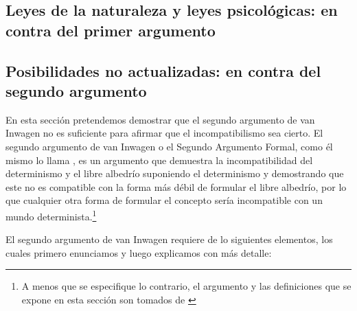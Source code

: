 \documentclass[12pt]{article} %
\begin{document}
	\subsection{Leyes de la naturaleza y leyes psicológicas: en contra del primer argumento}
	\subsection{Posibilidades no actualizadas: en contra del segundo argumento}
En esta sección pretendemos demostrar que el segundo argumento de van Inwagen no es suficiente para afirmar que el incompatibilismo sea cierto. El segundo argumento de van Inwagen o el Segundo Argumento Formal, como él mismo lo llama \parencite[83]{Inwagen1986}, es un argumento que demuestra la incompatibilidad del determinismo y el libre albedrío suponiendo el determinismo y demostrando que este no es compatible con la forma más débil de formular el libre albedrío, por lo que cualquier otra forma de formular el concepto sería incompatible con un mundo determinista.\footnote{A menos que se especifique lo contrario, el argumento y las definiciones que se expone en esta sección son tomados de \parencite[secs. 3.9-3.10]{Inwagen1986}}

El segundo argumento de van Inwagen requiere de lo siguientes elementos, los cuales primero enunciamos y luego explicamos con más detalle:
\end{document}
